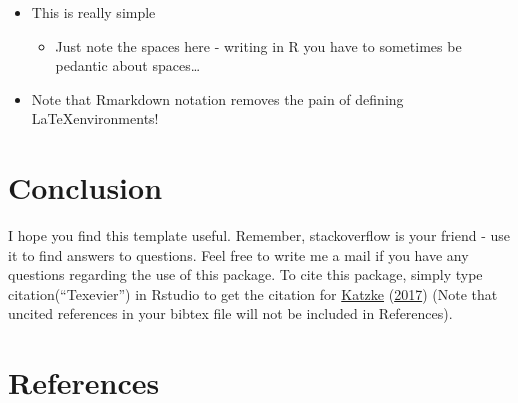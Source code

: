 \documentclass[11pt,preprint, authoryear]{elsarticle}
\numberwithin{equation}{section}
\numberwithin{figure}{section}
\numberwithin{table}{section}
\def\tightlist{} %
\begin{document}
\begin{itemize}
\item
  This is really simple

  \begin{itemize}
  \tightlist
  \item
    Just note the spaces here - writing in R you have to sometimes be
    pedantic about spaces\ldots{}
  \end{itemize}
\item
  Note that Rmarkdown notation removes the pain of defining
  \LaTeX environments!
\end{itemize}

\hypertarget{conclusion-1}{%
\section{Conclusion}\label{conclusion-1}}

I hope you find this template useful. Remember, stackoverflow is your
friend - use it to find answers to questions. Feel free to write me a
mail if you have any questions regarding the use of this package. To
cite this package, simply type citation(``Texevier'') in Rstudio to get
the citation for \protect\hyperlink{ref-Texevier}{Katzke}
(\protect\hyperlink{ref-Texevier}{2017}) (Note that uncited references
in your bibtex file will not be included in References).

\newpage

\hypertarget{references}{%
\section*{References}\label{references}}
\end{document}

